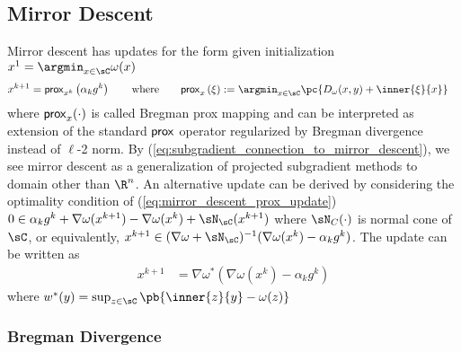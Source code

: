 \documentclass[../summary.tex]{subfiles}
\begin{document}

\subsection{Mirror Descent}

Mirror descent has updates for the form given initialization $x^1 = \argmin_{x\in\sC} \omega(x)$ 
\begin{align}
    x^{k+1}
        &= \prox_{x^k}\left( \alpha_k g^k \right)
    \qquad\text{where}\qquad
    \prox_{x}\left( \xi \right)
        := \argmin_{x\in\sC} \pc{
            D_{\omega}(x,y) + \inner{\xi}{x}
        }
        \label{eq:mirror_descent_prox_update}
\end{align}
where $\mathsf{prox}_{x}(\cdot)$ is called Bregman prox mapping and can be interpreted as extension of the standard $\mathsf{prox}$ operator regularized by Bregman divergence instead of $\ell$-2 norm. By (\ref{eq:subgradient_connection_to_mirror_descent}), we see mirror descent as a generalization of projected subgradient methods to domain other than $\R^n$. An alternative update can be derived by considering the optimality condition of (\ref{eq:mirror_descent_prox_update}) $0 \in \alpha_k g^k + \nabla \omega(x^{k+1}) - \nabla \omega(x^k) + \sN_{\sC}(x^{k+1})$ where $\sN_C(\cdot)$ is normal cone of $\sC$, or equivalently, $x^{k+1} \in (\nabla \omega + \sN_{\sC})^{-1}(\nabla \omega(x^k) - \alpha_k g^k)$. The update can be written as 
\begin{align}
    x^{k+1}
        &= \nabla \omega^* \left( \nabla \omega(x^k) - \alpha_k g^k \right)
\end{align}
where $w^*(y) = \sup_{z\in\sC}\pb{\inner{z}{y} - \omega(z)}$


\subsubsection{Bregman Divergence}
\end{document}
